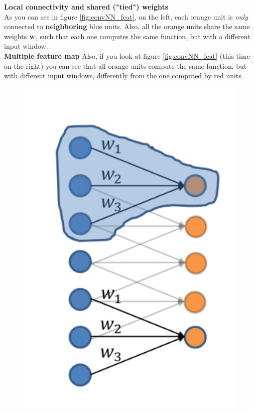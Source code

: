 \documentclass[12pt]{report}
\theoremstyle{plain}
\begin{document}
\begin{flushleft}
\textbf{Local connectivity and shared ("tied") weights}\\
As you can see in figure \ref{fig:convNN_feat}, on the left, each orange unit is \textit{only} connected to \textbf{neighboring} blue units. Also, all the orange units share the same weights $\vb{w}$, such that each one computes the same function, but with a different input window.\\
\textbf{Multiple feature map}
Also, if you look at figure \ref{fig:convNN_feat} (this time on the right) you can see that all orange units compute the same function, but with different input windows, differently from the one computed by red units.\\


\begin{figure}[!h]
	\centering
	\includegraphics[scale=0.8]{images/convNN_localconn_sharedw.pdf}\hfill

\end{figure}
\end{flushleft}
\end{document}
